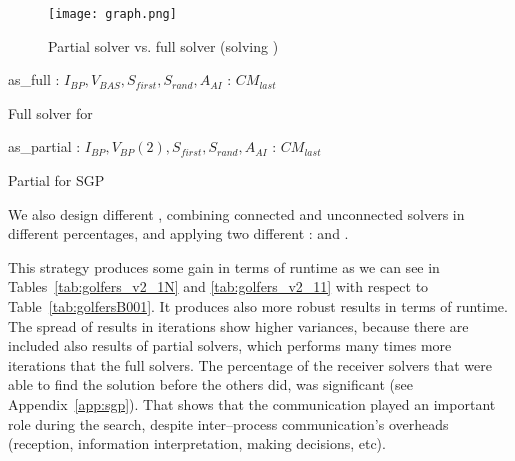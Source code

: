 \begin{figure}
\centering
\texttt{[image: graph.png]} 
\caption{Partial solver vs. full solver (solving \sgp)}
\label{fig:solversgolfers}
\end{figure}

\begin{algorithm}
\dontprintsemicolon
\SetNoline
{}
   as\_full\;
\algoindent {} : $I_{BP}, V_{BAS}, S_{first}, S_{rand}, A_{AI}$ \;
\algoindent {} : $CM_{last}$ \;
\caption{Full solver for \sgp}\label{as:golfers_full}
\end{algorithm}

\begin{algorithm}
\dontprintsemicolon
\SetNoline
{}
   as\_partial\;
\algoindent {} : $I_{BP}, V_{BP}(2), S_{first}, S_{rand}, A_{AI}$ \;
\algoindent {} : $CM_{last}$ \;
\caption{Partial \as{} for SGP}\label{as:golfers_partial}
\end{algorithm}

We also design different \commstrs, combining connected and unconnected solvers in different percentages, and applying two different \commopers: \oneTone{} and \oneTn.

This strategy produces some gain in terms of runtime as we can see in Tables~\ref{tab:golfers_v2_1N} and \ref{tab:golfers_v2_11} with respect to Table~\ref{tab:golfersB001}. It produces also more robust results in terms of runtime. The spread of results in iterations show higher variances, because there are included also results of partial solvers, which performs many times more iterations that the full solvers. The percentage of the receiver solvers that were able to find the solution before the others did, was significant (see Appendix~\ref{app:sgp}). That shows that the communication played an important role during the search, despite inter--process communication's overheads (reception, information interpretation, making decisions, etc).

